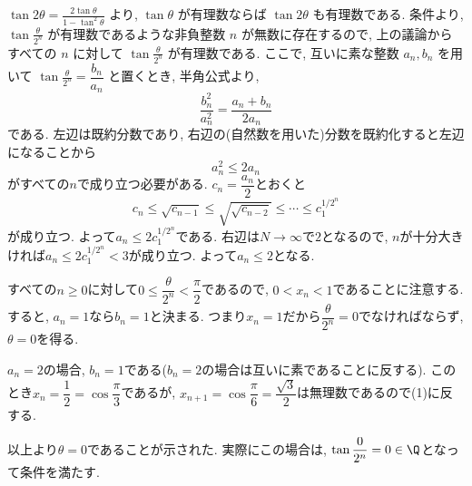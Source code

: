 $\tan{2\theta} = \frac{2\tan{\theta}}{1-\tan^2{\theta}}$ より, $\tan{\theta}$ が有理数ならば $\tan{2\theta}$ も有理数である.
条件より, $\tan{\frac{\theta}{2^n}}$ が有理数であるような非負整数 $n$ が無数に存在するので, 上の議論からすべての $n$ に対して $\tan{\frac{\theta}{2^n}}$ が有理数である.
ここで, 互いに素な整数 $a_n, b_n$ を用いて $\tan{\frac{\theta}{2^n}} = \dfrac{b_n}{a_n}$ と置くとき,
半角公式より,
\[
\dfrac{b_n^2}{a_n^2} = \dfrac{a_n + b_n}{2a_n}
\]
である. 左辺は既約分数であり, 右辺の(自然数を用いた)分数を既約化すると左辺になることから
\[
a_n^2 \leq 2a_n
\]
がすべての$n$で成り立つ必要がある. $c_n = \dfrac{a_n}{2}$とおくと
\[
c_n \leq \sqrt{c_{n-1}} \leq \sqrt{\sqrt{c_{n-2}}} \leq \cdots \leq c_1^{1/2^n}
\]
が成り立つ. よって$a_n \leq 2c_1^{1/2^{n}}$である. 右辺は$N\to\infty$で$2$となるので,  $n$が十分大きければ$a_n \leq 2c_1^{1/2^n} < 3$が成り立つ. よって$a_n \leq 2$となる. \par
すべての$n\geq 0$に対して$0\leq \dfrac{\theta}{2^n} < \dfrac{\pi}{2}$であるので, $0<x_n<1$であることに注意する. すると, $a_n = 1$なら$b_n = 1$と決まる. つまり$x_n = 1$だから$\dfrac{\theta}{2^n} = 0$でなければならず, $\theta=0$を得る. \par
$a_n = 2$の場合, $b_n = 1$である($b_n = 2$の場合は互いに素であることに反する). このとき$x_n = \dfrac{1}{2} = \cos{\dfrac{\pi}{3}}$であるが, $x_{n+1} = \cos{\dfrac{\pi}{6}} = \dfrac{\sqrt{3}}{2}$は無理数であるので(1)に反する. \par
以上より$\theta=0$であることが示された. 実際にこの場合は, $\tan{\dfrac{0}{2^n}} = 0\in \Q$となって条件を満たす.
